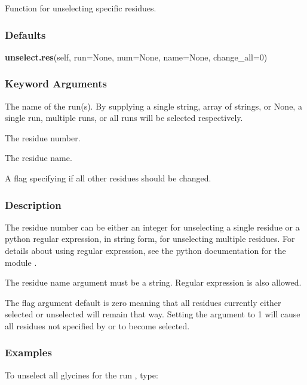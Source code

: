 Function for unselecting specific residues.

\subsubsection{Defaults}

\textsf{\textbf{unselect.res}(self, run=None, num=None, name=None, change\_all=0)}


\subsubsection{Keyword Arguments}


  The name of the run(s).  By supplying a single string, array of strings, or None, a single run, multiple runs, or all runs will be selected respectively.

  The residue number.

  The residue name.

  A flag specifying if all other residues should be changed.

\subsubsection{Description}

The residue number can be either an integer for unselecting a single residue or a python 
regular expression,  in string form, for unselecting multiple residues.  For details about
using regular expression,  see the python  documentation for the module 
.

The residue name argument must be a string.  Regular expression  is also allowed.

The 
 flag argument default is zero meaning that all residues currently either
selected or unselected will remain that way.  Setting the argument to 1 will cause all
residues not specified by 
 or 
 to become selected.


\subsubsection{Examples}

To unselect all glycines for the run 
, type:


